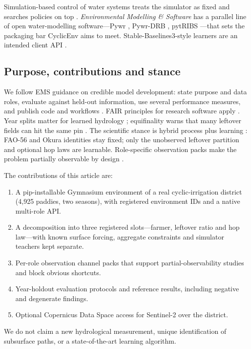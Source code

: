 \documentclass[preprint,12pt,authoryear,review]{elsarticle}
\begin{document}
Simulation-based control of water systems treats the simulator as fixed and searches policies on top \citep{giuliani2021}. \emph{Environmental Modelling \& Software} has a parallel line of open water-modelling software---Pywr \citep{tomlinson2020}, Pywr-DRB \citep{hamilton2024}, pytRIBS \citep{raming2025}---that sets the packaging bar CyclicEnv aims to meet. Stable-Baselines3-style learners are an intended client API \citep{raffin2021}.

\subsection{Purpose, contributions and stance}

We follow EMS guidance on credible model development: state purpose and data roles, evaluate against held-out information, use several performance measures, and publish code and workflows \citep{jakeman2006,bennett2013,hutton2016,lemmen2024}. FAIR principles for research software apply \citep{barker2022}. Year splits matter for learned hydrology \citep{gauch2021}; equifinality warns that many leftover fields can hit the same pin \citep{beven2006}. The scientific stance is hybrid process plus learning \citep{reichstein2019,nearing2021}: FAO-56 and Okura identities stay fixed; only the unobserved leftover partition and optional hop laws are learnable. Role-specific observation packs make the problem partially observable by design \citep{kaelbling1998}.

The contributions of this article are:
\begin{enumerate}
\item A pip-installable Gymnasium environment of a real cyclic-irrigation district (4,925 paddies, two seasons), with registered environment IDs and a native multi-role API.
\item A decomposition into three registered slots---farmer, leftover ratio and hop law---with known surface forcing, aggregate constraints and simulator teachers kept separate.
\item Per-role observation channel packs that support partial-observability studies and block obvious shortcuts.
\item Year-holdout evaluation protocols and reference results, including negative and degenerate findings.
\item Optional Copernicus Data Space access for Sentinel-2 over the district.
\end{enumerate}
We do not claim a new hydrological measurement, unique identification of subsurface paths, or a state-of-the-art learning algorithm.
\end{document}
